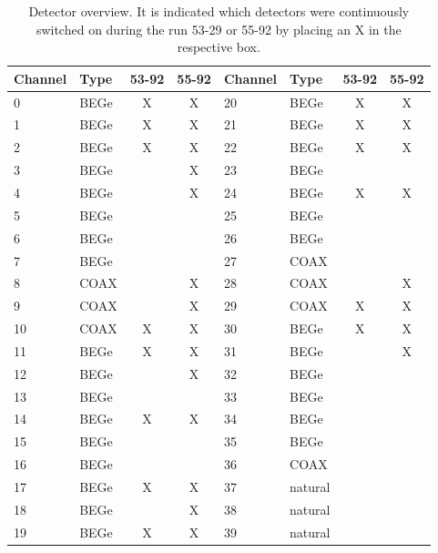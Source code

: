 \begin{table}
    \centering
	\begin{tabular}{|l|l|c|c||l|l|c|c|}
		\hline
		Channel & Type & 53-92 & 55-92 & Channel & Type & 53-92 & 55-92 \\
		\hline
		0 & BEGe & X & X & 20 & BEGe & X & X \\
		\hline
		1 & BEGe & X & X & 21 & BEGe & X & X \\
		\hline
		2 & BEGe & X & X & 22 & BEGe & X & X \\
		\hline
		3 & BEGe &  & X & 23 & BEGe &  &  \\
		\hline
		4 & BEGe &  & X & 24 & BEGe & X & X \\
		\hline
		5 & BEGe &  &  & 25 & BEGe &  &  \\
		\hline
		6 & BEGe &  &  & 26 & BEGe &  &  \\
		\hline
		7 & BEGe &  &  & 27 & COAX &  &  \\
		\hline
		8 & COAX &  & X & 28 & COAX &  & X \\
		\hline
		9 & COAX &  & X & 29 & COAX & X & X \\
		\hline
		10 & COAX & X & X & 30 & BEGe & X & X \\
		\hline
		11 & BEGe & X & X & 31 & BEGe &  & X \\
		\hline
		12 & BEGe &  & X & 32 & BEGe &  &  \\
		\hline
		13 & BEGe &  &  & 33 & BEGe &  &  \\
		\hline
		14 & BEGe & X & X & 34 & BEGe & &  \\
		\hline
		15 & BEGe &  &  & 35 & BEGe &  &  \\
		\hline
		16 & BEGe &  &  & 36 & COAX &  &  \\
		\hline
		17 & BEGe & X & X & 37 & natural &  &  \\
		\hline
		18 & BEGe &  & X & 38 & natural &  &  \\
		\hline
		19 & BEGe & X & X & 39 & natural &  &  \\
		\hline
	\end{tabular}
	\caption{Detector overview. It is indicated which detectors were continuously switched on during the run 53-29 or 55-92 by placing an X in the respective box.}
	\label{tab:Detector}
\end{table}


